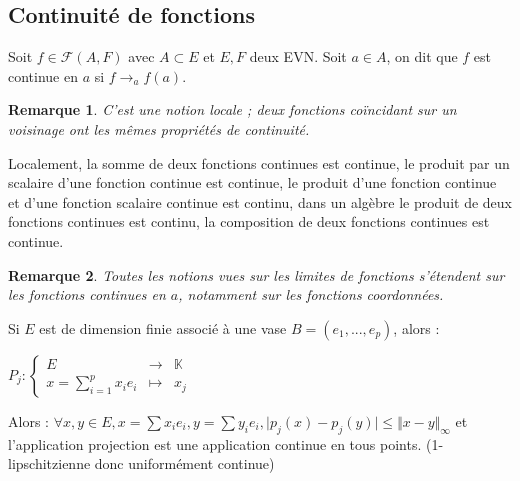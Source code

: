 \documentclass[a4paper,12pt]{book}
\newcommand{\Def}[2]{\begin{tcolorbox}[sharp corners, colback=white,colframe=blue!90!black!75, title=Définition : #1]#2\end{tcolorbox}}
\newcommand{\Prop}[2]{\begin{tcolorbox}[sharp corners, colback=white,colframe=red!90!black!75, title=Proposition : #1]#2\end{tcolorbox}}
\newtheorem{Rem}{Remarque}[section]
\def\K{\mathbb{K}}
\begin{document}
\subsection{Continuité de fonctions}
\Def{Continuité}{Soit $f\in\mathcal{F}(A,F)$ avec $A\subset E$ et $E,F$ deux EVN. Soit $a\in A$, on dit que $f$ est continue en $a$ si $f\to_a f(a)$.}
\begin{Rem}
C'est une notion locale ; deux fonctions coïncidant sur un voisinage ont les mêmes propriétés de continuité.
\end{Rem}
\Prop{Opérations}{Localement, la somme de deux fonctions continues est continue, le produit par un scalaire d'une fonction continue est continue, le produit d'une fonction continue et d'une fonction scalaire continue est continu, dans un algèbre le produit de deux fonctions continues est continu, la composition de deux fonctions continues est continue.}
\begin{Rem}
Toutes les notions vues sur les limites de fonctions s'étendent sur les fonctions continues en $a$, notamment sur les fonctions coordonnées.
\end{Rem}
\Prop{}{Si $E$ est de dimension finie associé à une vase $B=(e_1,...,e_p)$, alors :
\par \begin{center} $P_j:\left\{\begin{array}{rcl} E & \to & \K \\ x=\sum\limits_{i=1}^px_ie_i & \mapsto & x_j \end{array}\right.$\end{center}
\par Alors : $\forall x,y\in E, x=\sum x_ie_i, y=\sum y_ie_i, \vert p_j(x) - p_j(y)\vert\leq\Vert x-y\Vert_\infty$ et l'application projection est une application continue en tous points. (1-lipschitzienne donc uniformément continue)}
\end{document}
